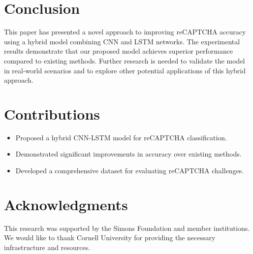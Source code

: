 \documentclass{article}
\begin{document}
\section{Conclusion}
This paper has presented a novel approach to improving reCAPTCHA accuracy using a hybrid model combining CNN and LSTM networks. The experimental results demonstrate that our proposed model achieves superior performance compared to existing methods. Further research is needed to validate the model in real-world scenarios and to explore other potential applications of this hybrid approach.

\section{Contributions}
\begin{itemize}
    \item Proposed a hybrid CNN-LSTM model for reCAPTCHA classification.
    \item Demonstrated significant improvements in accuracy over existing methods.
    \item Developed a comprehensive dataset for evaluating reCAPTCHA challenges.
\end{itemize}

\section*{Acknowledgments}
This research was supported by the Simons Foundation and member institutions. We would like to thank Cornell University for providing the necessary infrastructure and resources.



\end{document}
